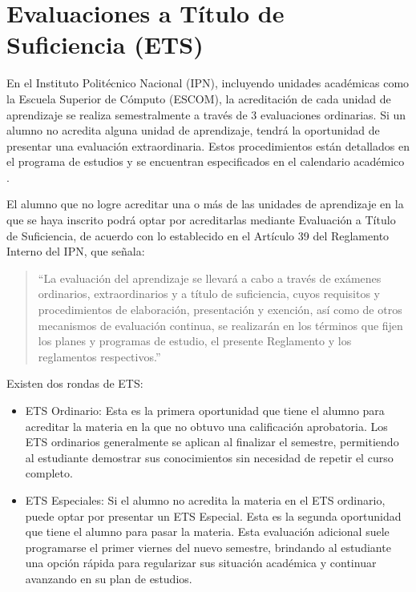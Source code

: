 
\section{Evaluaciones a Título de Suficiencia (ETS)}
En el Instituto Politécnico Nacional (IPN), incluyendo unidades académicas como la Escuela Superior de Cómputo (ESCOM), la acreditación de cada unidad de aprendizaje se realiza semestralmente a través de 3 evaluaciones ordinarias. Si un alumno no acredita alguna unidad de aprendizaje, tendrá la oportunidad de presentar una evaluación extraordinaria. Estos procedimientos están detallados en el programa de estudios y se encuentran especificados en el calendario académico \cite{refIPN}.

El alumno que no logre acreditar una o más de las unidades de aprendizaje en la que se haya inscrito podrá optar por acreditarlas mediante Evaluación a Título de Suficiencia, de acuerdo con lo establecido en el Artículo 39 del Reglamento Interno del IPN, que señala: 

\begin{quote}
	``La evaluación del aprendizaje se llevará a cabo a través de exámenes ordinarios, extraordinarios y a título de suficiencia, cuyos requisitos y procedimientos de elaboración, presentación y exención, así como de otros mecanismos de evaluación continua, se realizarán en los términos que fijen los planes y programas de estudio, el presente Reglamento y los reglamentos respectivos.''
\end{quote}

Existen dos rondas de ETS:
\begin{itemize}
	\item ETS Ordinario: Esta es la primera oportunidad que tiene el alumno para acreditar la materia en la que no obtuvo una calificación aprobatoria. Los ETS ordinarios generalmente se aplican al finalizar el semestre, permitiendo al estudiante demostrar sus conocimientos sin necesidad de repetir el curso completo. 
	\item ETS Especiales: Si el alumno no acredita la materia en el ETS ordinario, puede optar por presentar un ETS Especial. Esta es la segunda oportunidad que tiene el alumno para pasar la materia. Esta evaluación adicional suele programarse el primer viernes del nuevo semestre, brindando al estudiante una opción rápida para regularizar sus situación académica y continuar avanzando en su plan de estudios. 
\end{itemize}

